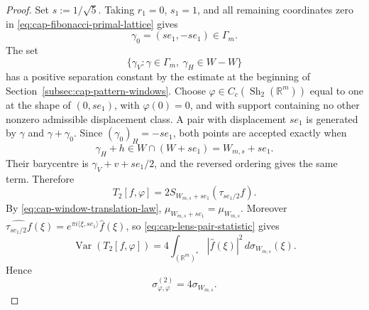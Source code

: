 \documentclass[11pt,reqno,a4paper]{amsart}
\numberwithin{equation}{section}
\theoremstyle{compact}
\theoremstyle{definition}
\theoremstyle{definition}
\newcommand{\Var}{\operatorname{Var}}
\newcommand{\Sh}{\operatorname{Sh}}
\begin{document}
\begin{proof}
Set \(s:=1/\sqrt5\).  Taking \(r_1=0\), \(s_1=1\), and all remaining
coordinates zero in \eqref{eq:cap-fibonacci-primal-lattice} gives
\begin{equation}\label{eq:cap-lens-primal-displacement}
  \gamma_0=(se_1,-se_1)\in\Gamma_m.
\end{equation}
The set
\begin{equation}\label{eq:cap-relevant-difference-set}
  \{\gamma_V:\gamma\in\Gamma_m,\ \gamma_H\in W-W\}
\end{equation}
has a positive separation constant by the estimate at the beginning of
Section~\ref{subsec:cap-pattern-windows}.  Choose
$\varphi\in C_c(\Sh_2(\mathbb R^m))$ equal to one at the shape of
$(0,se_1)$, with $\varphi(0)=0$, and with support containing no other nonzero
admissible displacement class.  A pair with displacement $se_1$ is generated
by $\gamma$ and $\gamma+\gamma_0$.  Since $(\gamma_0)_H=-se_1$, both points
are accepted exactly when
\[
  \gamma_H+h\in W\cap(W+se_1)=W_{m,s}+se_1.
\]
Their barycentre is $\gamma_V+v+se_1/2$, and the reversed ordering gives the
same term.  Therefore
\begin{equation}\label{eq:cap-lens-pair-statistic}
  T_2[f,\varphi]
  =2S_{W_{m,s}+se_1}(\tau_{se_1/2}f).
\end{equation}
By \eqref{eq:cap-window-translation-law},
$\mu_{W_{m,s}+se_1}=\mu_{W_{m,s}}$.  Moreover
$\widehat{\tau_{se_1/2}f}(\xi)
=e^{\pi i\langle\xi,se_1\rangle}\widehat f(\xi)$, so
\eqref{eq:cap-lens-pair-statistic} gives
\[
  \Var(T_2[f,\varphi])
  =4\int_{(\mathbb R^m)^*}|\widehat f(\xi)|^2\,d\sigma_{W_{m,s}}(\xi).
\]
Hence
\begin{equation}\label{eq:cap-lens-pair-spectrum}
  \sigma^{(2)}_{\varphi,\varphi}=4\sigma_{W_{m,s}}.
\end{equation}


\end{proof}
\end{document}
